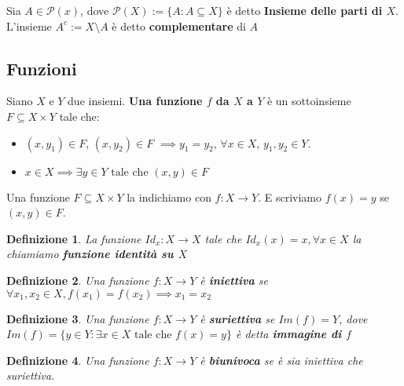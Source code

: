 \documentclass[a4paper,12pt]{article}
\theoremstyle{def}
\newtheorem*{definition}{Definizione}
\theoremstyle{prop}
\theoremstyle{esempio}
\theoremstyle{dimostrazione}
\theoremstyle{teo}
\theoremstyle{osservazione}
\begin{document}
Sia \begin{math}
    A \in \mathcal{P} (x)
\end{math}, dove \begin{math}
    \mathcal{P} (X) := \{ A : A \subseteq X \}
\end{math} è detto \textbf{Insieme delle parti di \(X\)}. L'insieme \begin{math}
    A^c := X \setminus A
\end{math} è detto \textbf{complementare} di \(A\)


\subsection{Funzioni}

Siano \(X\) e \(Y\) due insiemi. \textbf{Una funzione \(f\) da \(X\) a \(Y\)} è un sottoinsieme \(F \subseteq X \times Y\)
tale che:
\begin{itemize}
    \item \((x, y_1) \in F\), \((x,y_2) \in F\) \(\implies y_1 = y_2\), \(\forall x \in X\), \(y_1,y_2 \in Y\).
    \item \(x \in X \implies \exists y \in Y \text{ tale che } (x,y) \in F\)
\end{itemize}


Una funzione \(F \subseteq X \times Y\) la indichiamo con \(f : X \to Y\). E scriviamo \(f(x) = y\) se \((x,y) \in F\).


\begin{definition}
    La funzione \(Id_x : X \rightarrow X \) tale che \(Id_x (x) = x, \forall x \in X\) la chiamiamo \textbf{funzione
        identità su \(X\)}
\end{definition}

\begin{definition}
    Una funzione \(f: X \rightarrow Y\) è \textbf{iniettiva} se \(\forall x_1, x_2 \in X, f(x_1) = f(x_2)
    \implies x_1 = x_2\)
\end{definition}

\begin{definition}
    Una funzione \(f: X \rightarrow Y\) è \textbf{suriettiva} se \(Im(f) = Y\), dove \(Im(f) = \{ y \in Y :
    \exists x \in X \text{ tale che } f(x) = y \}\) è detta \textbf{immagine di \(f\)}
\end{definition}

\begin{definition}
    Una funzione \(f: X \rightarrow Y\) è \textbf{biunivoca} se è sia iniettiva che suriettiva.
\end{definition}
\end{document}
